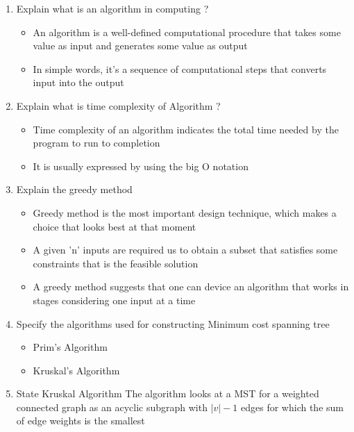 \begin{enumerate}[label=\arabic*. ]
	\item Explain what is an algorithm in computing ?
	\answer
		\begin{itemize}[label=$\ast$]
			\item An algorithm is a well-defined computational procedure that takes some value as
				input and generates some value as output
			\item In simple words, it's a sequence of computational steps that converts input into
				the output
		\end{itemize}

	\item Explain what is time complexity of Algorithm ?
	\answer
		\begin{itemize}[label=$\ast$]
			\item Time complexity of an algorithm indicates the total time needed by the program to
				run to completion
			\item It is usually expressed by using the big O notation
		\end{itemize}

	\item Explain the greedy method
	\answer
		\begin{itemize}[label=$\ast$]
			\item Greedy method is the most important design technique, which makes a choice that
				looks best at that moment
			\item A given 'n' inputs are required us to obtain a subset that satisfies some
				constraints that is the feasible solution
			\item A greedy method suggests that one can device an algorithm that works in stages
				considering one input at a time
		\end{itemize}
	
	\item Specify the algorithms used for constructing Minimum cost spanning tree
		\begin{itemize}[label=$\ast$]
			\item Prim's Algorithm
			\item Kruskal's Algorithm
		\end{itemize}
	
	\item State Kruskal Algorithm
	\answer The algorithm looks at a MST for a weighted connected graph as an acyclic subgraph with $|v|-1$
		edges for which the sum of edge weights is the smallest
	

\end{enumerate}
